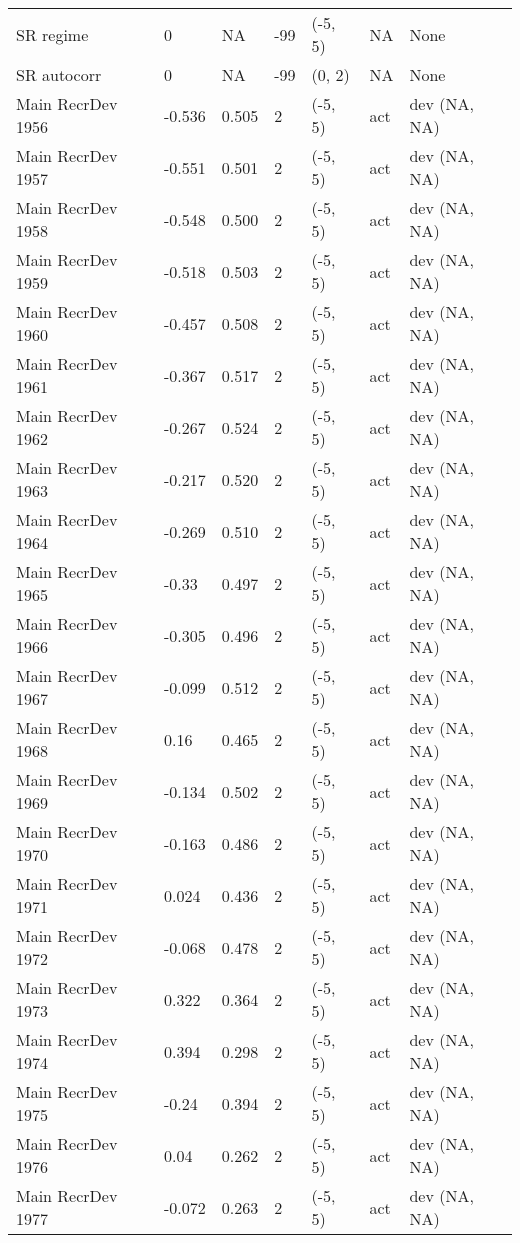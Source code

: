\documentclass[11pt,
  english,
  letterpaper,
]{article}
\begin{document}
\begin{landscape}
\begin{longtable}[t]{>{\raggedright\arraybackslash}p{7.5cm}lllll>{\raggedright\arraybackslash}p{3.5cm}}
SR regime & 0 & NA & -99 & (-5, 5) & NA & None\\
SR autocorr & 0 & NA & -99 & (0, 2) & NA & None\\
Main RecrDev 1956 & -0.536 & 0.505 & 2 & (-5, 5) & act & dev (NA, NA)\\
Main RecrDev 1957 & -0.551 & 0.501 & 2 & (-5, 5) & act & dev (NA, NA)\\
Main RecrDev 1958 & -0.548 & 0.500 & 2 & (-5, 5) & act & dev (NA, NA)\\
Main RecrDev 1959 & -0.518 & 0.503 & 2 & (-5, 5) & act & dev (NA, NA)\\
Main RecrDev 1960 & -0.457 & 0.508 & 2 & (-5, 5) & act & dev (NA, NA)\\
Main RecrDev 1961 & -0.367 & 0.517 & 2 & (-5, 5) & act & dev (NA, NA)\\
Main RecrDev 1962 & -0.267 & 0.524 & 2 & (-5, 5) & act & dev (NA, NA)\\
Main RecrDev 1963 & -0.217 & 0.520 & 2 & (-5, 5) & act & dev (NA, NA)\\
Main RecrDev 1964 & -0.269 & 0.510 & 2 & (-5, 5) & act & dev (NA, NA)\\
Main RecrDev 1965 & -0.33 & 0.497 & 2 & (-5, 5) & act & dev (NA, NA)\\
Main RecrDev 1966 & -0.305 & 0.496 & 2 & (-5, 5) & act & dev (NA, NA)\\
Main RecrDev 1967 & -0.099 & 0.512 & 2 & (-5, 5) & act & dev (NA, NA)\\
Main RecrDev 1968 & 0.16 & 0.465 & 2 & (-5, 5) & act & dev (NA, NA)\\
Main RecrDev 1969 & -0.134 & 0.502 & 2 & (-5, 5) & act & dev (NA, NA)\\
Main RecrDev 1970 & -0.163 & 0.486 & 2 & (-5, 5) & act & dev (NA, NA)\\
Main RecrDev 1971 & 0.024 & 0.436 & 2 & (-5, 5) & act & dev (NA, NA)\\
Main RecrDev 1972 & -0.068 & 0.478 & 2 & (-5, 5) & act & dev (NA, NA)\\
Main RecrDev 1973 & 0.322 & 0.364 & 2 & (-5, 5) & act & dev (NA, NA)\\
Main RecrDev 1974 & 0.394 & 0.298 & 2 & (-5, 5) & act & dev (NA, NA)\\
Main RecrDev 1975 & -0.24 & 0.394 & 2 & (-5, 5) & act & dev (NA, NA)\\
Main RecrDev 1976 & 0.04 & 0.262 & 2 & (-5, 5) & act & dev (NA, NA)\\
Main RecrDev 1977 & -0.072 & 0.263 & 2 & (-5, 5) & act & dev (NA, NA)\\

\end{longtable}
\end{landscape}
\end{document}
